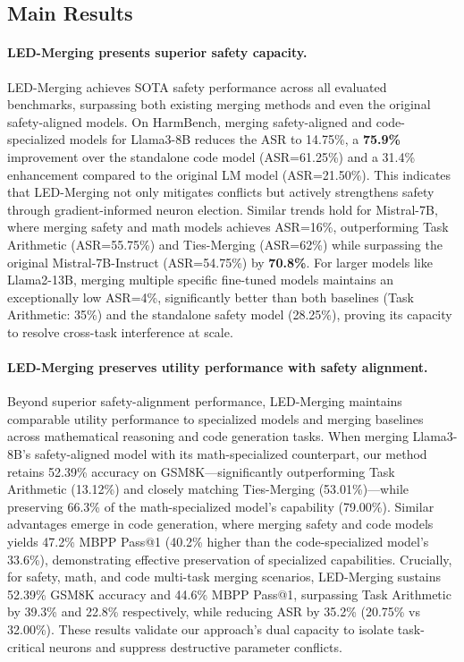 \subsection{Main Results}

\paragraph{LED-Merging presents superior safety capacity.}
LED-Merging achieves SOTA safety performance across all evaluated benchmarks, surpassing both existing merging methods and even the original safety-aligned models.
On HarmBench, merging safety-aligned and code-specialized models for Llama3-8B reduces the ASR to 14.75\%, a \textbf{75.9\%} improvement over the standalone code model (ASR=61.25\%) and a 31.4\% enhancement compared to the original LM model (ASR=21.50\%). This indicates that LED-Merging not only mitigates conflicts but actively strengthens safety through gradient-informed neuron election.
Similar trends hold for Mistral-7B, where merging safety and math models achieves ASR=16\%, outperforming Task Arithmetic (ASR=55.75\%) and Ties-Merging (ASR=62\%) while surpassing the original Mistral-7B-Instruct (ASR=54.75\%) by \textbf{70.8\%}. For larger models like Llama2-13B, merging multiple specific fine-tuned models maintains an exceptionally low ASR=4\%, significantly better than both baselines (Task Arithmetic: 35\%) and the standalone safety model (28.25\%), proving its capacity to resolve cross-task interference at scale.

\paragraph{LED-Merging preserves utility performance with safety alignment.}
Beyond superior safety-alignment performance, LED-Merging maintains comparable utility performance to specialized models and merging baselines across mathematical reasoning and code generation tasks. When merging Llama3-8B's safety-aligned model with its math-specialized counterpart, our method retains 52.39\% accuracy on GSM8K—significantly outperforming Task Arithmetic (13.12\%) and closely matching Ties-Merging (53.01\%)—while preserving 66.3\% of the math-specialized model's capability (79.00\%). Similar advantages emerge in code generation, where merging safety and code models yields 47.2\% MBPP Pass@1 (40.2\% higher than the code-specialized model's 33.6\%), demonstrating effective preservation of specialized capabilities. 
Crucially, for safety, math, and code multi-task merging scenarios, LED-Merging sustains 52.39\% GSM8K accuracy and 44.6\% MBPP Pass@1, surpassing Task Arithmetic by 39.3\% and 22.8\% respectively, while reducing ASR by 35.2\% (20.75\% vs 32.00\%). These results validate our approach's dual capacity to isolate task-critical neurons and suppress destructive parameter conflicts.





